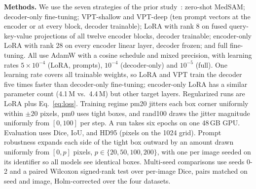 \documentclass[runningheads]{llncs}
\begin{document}
\textbf{Methods.} We use the seven strategies of the prior study~\cite{prior2026safer}: zero-shot MedSAM; decoder-only fine-tuning; VPT-shallow and VPT-deep (ten prompt vectors at the encoder or at every block, decoder trainable); LoRA with rank 8 on fused query-key-value projections of all twelve encoder blocks, decoder trainable; encoder-only LoRA with rank 28 on every encoder linear layer, decoder frozen; and full fine-tuning. All use AdamW with a cosine schedule and mixed precision, with learning rates $5 \times 10^{-4}$ (LoRA, prompts), $10^{-4}$ (decoder-only) and $10^{-5}$ (full). One learning rate covers all trainable weights, so LoRA and VPT train the decoder five times faster than decoder-only fine-tuning; encoder-only LoRA has a similar parameter count (4.1\,M vs.\ 4.4\,M) but other target layers. Regularized runs are LoRA plus Eq.~\eqref{eq:loss}. Training regime pm20 jitters each box corner uniformly within $\pm 20$ pixels, pm0 uses tight boxes, and rand100 draws the jitter magnitude uniformly from $[0, 100]$ per step. A run takes six epochs on one 48\,GB GPU. Evaluation uses Dice, IoU, and HD95 (pixels on the 1024 grid). Prompt robustness expands each side of the tight box outward by an amount drawn uniformly from $[0, p]$ pixels, $p \in \{20, 50, 100, 200\}$, with one per image seeded on its identifier so all models see identical boxes. Multi-seed comparisons use seeds 0-2 and a paired Wilcoxon signed-rank test over per-image Dice, pairs matched on seed and image, Holm-corrected over the four datasets.

\begin{table}[tbp]
  \centering
  \caption{LoRA with and without the decoder CKA loss (20\,px training, tight-box evaluation), mean $\pm$ std over three seeds; $\Delta$HD95 in pixels; $p$: paired Wilcoxon over per-image Dice at 20\,px evaluation jitter, Holm-corrected. Dec./Full FT: decoder-only and full fine-tuning, same regime, mean (std $\leq$ 0.006).}
  \label{tab:cka}
  \setlength{\tabcolsep}{4pt}
\end{table}
\end{document}
